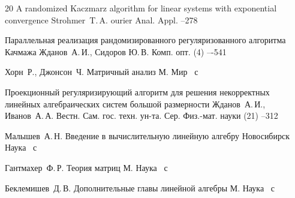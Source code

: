 \begin{thebibliography}{20}
\paper A randomized Kaczmarz algorithm for linear systems with exponential convergence
\by Strohmer~T.\,A.
\jour ourier Anal. Appl.
--278

\paper Параллельная реализация рандомизированного регуляризованного алгоритма Качмажа
\by Жданов~А.\,И., Сидоров Ю.\,В.
\jour Комп. опт.
(4)
–-541

\by Хорн~Р., Джонсон~Ч.
\book Матричный анализ
\publaddr М.
\publ Мир
~с

\paper Проекционный регуляризирующий алгоритм для решения некорректных линейных алгебраических систем большой размерности
\by Жданов~А.\,И., Иванов~А.\,А.
\jour  Вестн. Сам. гос. техн. ун-та. Сер. Физ.-мат. науки
(21)
--312

\by Малышев~А.\,Н.
\book Введение в вычислительную линейную алгебру
\publaddr Новосибирск
\publ Наука
~с

\by Гантмахер~Ф.\,Р.
\book Теория матриц
\publaddr М.
\publ Наука
~с

\by Беклемишев~Д.\,В.
\book Дополнительные главы линейной алгебры
\publaddr М.
\publ Наука
~с

\end{thebibliography}


\newpage


\makeengtitlem

%
%

